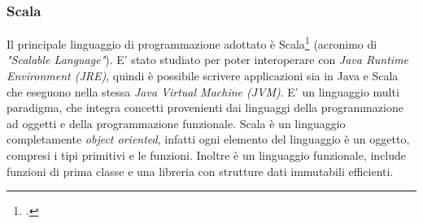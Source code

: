 \subsubsection{Scala}
Il principale linguaggio di programmazione adottato è Scala\footcite{http://www.scala-lang.org/} (acronimo di \emph{"Scalable Language"}). E' stato studiato per poter interoperare con \emph{Java Runtime Environment (JRE)}, quindi è possibile scrivere applicazioni sia in Java e Scala che eseguono nella stessa \emph{Java Virtual Machine (JVM)}. E' un linguaggio multi paradigma, che integra concetti provenienti dai linguaggi della programmazione ad oggetti e della programmazione funzionale. Scala è un linguaggio completamente \emph{object oriented}, infatti ogni elemento del linguaggio è un oggetto, compresi i tipi primitivi e le funzioni. Inoltre è un linguaggio funzionale, include funzioni di prima classe e una libreria con strutture dati immutabili efficienti.
